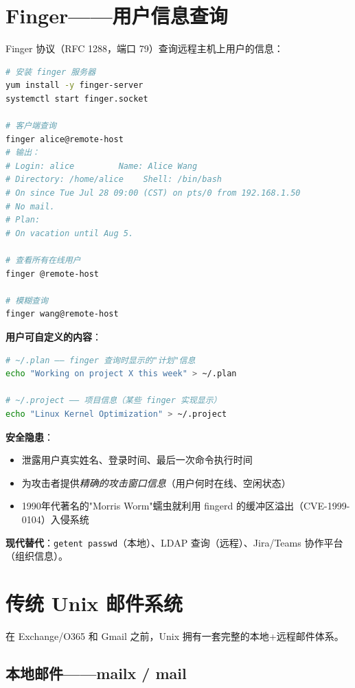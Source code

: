 \documentclass[12pt,UTF8]{ctexbook}
\begin{document}
\section{Finger——用户信息查询}
\label{sec:finger}

Finger 协议（RFC 1288，端口 79）查询远程主机上用户的信息：

\begin{lstlisting}[language=bash]
# 安装 finger 服务器
yum install -y finger-server
systemctl start finger.socket

# 客户端查询
finger alice@remote-host
# 输出：
# Login: alice         Name: Alice Wang
# Directory: /home/alice    Shell: /bin/bash
# On since Tue Jul 28 09:00 (CST) on pts/0 from 192.168.1.50
# No mail.
# Plan:
# On vacation until Aug 5.

# 查看所有在线用户
finger @remote-host

# 模糊查询
finger wang@remote-host
\end{lstlisting}

\textbf{用户可自定义的内容}：
\begin{lstlisting}[language=bash]
# ~/.plan —— finger 查询时显示的"计划"信息
echo "Working on project X this week" > ~/.plan

# ~/.project —— 项目信息（某些 finger 实现显示）
echo "Linux Kernel Optimization" > ~/.project
\end{lstlisting}

\textbf{安全隐患}：
\begin{itemize}
    \item 泄露用户真实姓名、登录时间、最后一次命令执行时间
    \item 为攻击者提供\emph{精确的攻击窗口信息}（用户何时在线、空闲状态）
    \item 1990年代著名的"Morris Worm"蠕虫就利用 fingerd 的缓冲区溢出（CVE-1999-0104）入侵系统
\end{itemize}

\textbf{现代替代}：\texttt{getent passwd}（本地）、LDAP 查询（远程）、Jira/Teams 协作平台（组织信息）。

\section{传统 Unix 邮件系统}
\label{sec:legacy-mail}

在 Exchange/O365 和 Gmail 之前，Unix 拥有一套完整的本地+远程邮件体系。

\subsection{本地邮件——mailx / mail}
\end{document}
